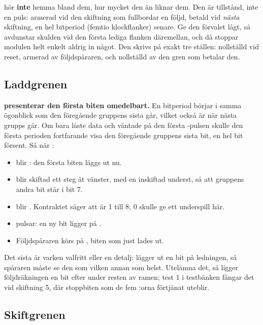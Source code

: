 \begin{warning}
 hör \textbf{inte} hemma bland dem, hur mycket den än liknar dem. Den är
tillstånd, inte en puls: armerad vid den skiftning som fullbordar en följd, betald vid \emph{nästa}
skiftning, en hel bitperiod (femtio klockflanker) senare. Ge den förvalet lågt, så avdunstar skulden
vid den första lediga flanken däremellan, och då stoppar modulen helt enkelt aldrig in något. Den
skrivs på exakt tre ställen: nollställd vid reset, armerad av följdspåraren, och nollställd av den
gren som betalar den.
\end{warning}

\subsection{Laddgrenen}
\label{c14:sub:load}

\textbf{ presenterar den första biten omedelbart.} En bitperiod börjar i samma
ögonblick som den föregående gruppens sista  går, vilket också är när nästa grupps
 går. Om  bara låste data och väntade på den första -pulsen skulle
den första perioden fortfarande visa den föregående gruppens sista bit, en hel bit försent. Så när
:
\begin{itemize}
  \item {} blir : den första biten läggs ut nu.
  \item {} blir  skiftad ett steg åt vänster, med en  inskiftad
    underst, så att gruppens andra bit står i bit 7.
  \item {} blir . Kontraktet säger att  är 1 till
    8; 0 skulle ge ett underspill här.
  \item {} pulsar: en ny bit ligger på .
  \item Följdspåraren körs på , biten som just lades ut.
\end{itemize}

Det sista är varken valfritt eller en detalj:  lägger ut en bit på ledningen, så spåraren
måste se den som vilken annan som helst. Utelämna det, så ligger följdräkningen en bit efter under
resten av ramen; test 1 i testbänken fångar det vid skiftning 5, där stoppbiten som de fem
:orna förtjänat uteblir.

\subsection{Skiftgrenen}
\label{c14:sub:shift}

